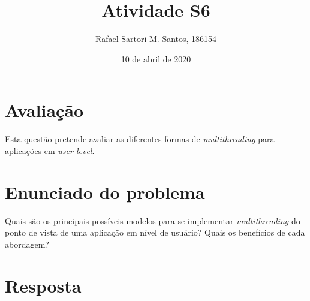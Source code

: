 \documentclass[brazilian,a4paper]{article}
\title{Atividade S6}
\author{Rafael Sartori M. Santos, 186154}
\date{10 de abril de 2020}
\begin{document}
\maketitle

\section*{Avaliação}

Esta questão pretende avaliar as diferentes formas de \textit{multithreading} para aplicações em \textit{user-level}.

\section*{Enunciado do problema}

Quais são os principais possíveis modelos para se implementar \textit{multithreading} do ponto de vista de uma aplicação em nível de usuário? Quais os benefícios de cada abordagem?

\section*{Resposta}
\end{document}
